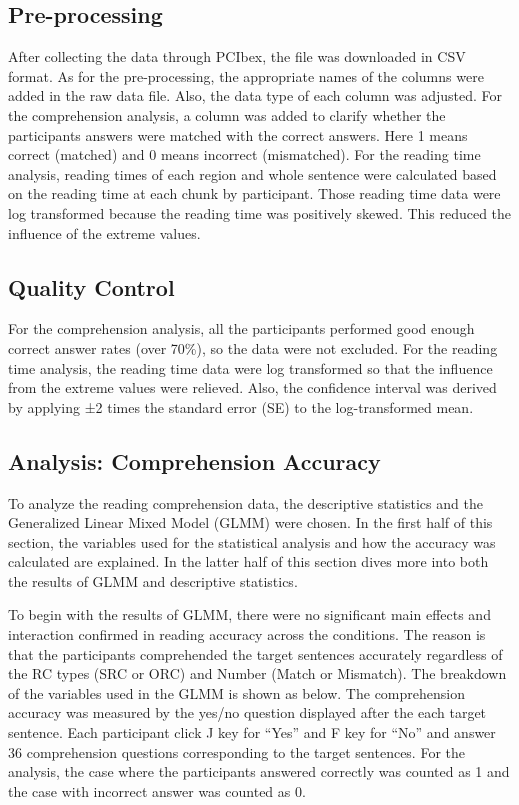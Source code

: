\documentclass[
]{article}
\begin{document}
\subsection{Pre-processing}\label{pre-processing}

After collecting the data through PCIbex, the file was downloaded in CSV
format. As for the pre-processing, the appropriate names of the columns
were added in the raw data file. Also, the data type of each column was
adjusted. For the comprehension analysis, a column was added to clarify
whether the participants answers were matched with the correct answers.
Here 1 means correct (matched) and 0 means incorrect (mismatched). For
the reading time analysis, reading times of each region and whole
sentence were calculated based on the reading time at each chunk by
participant. Those reading time data were log transformed because the
reading time was positively skewed. This reduced the influence of the
extreme values.

\subsection{Quality Control}\label{quality-control}

For the comprehension analysis, all the participants performed good
enough correct answer rates (over 70\%), so the data were not excluded.
For the reading time analysis, the reading time data were log
transformed so that the influence from the extreme values were relieved.
Also, the confidence interval was derived by applying ±2 times the
standard error (SE) to the log-transformed mean.

\subsection{Analysis: Comprehension
Accuracy}\label{analysis-comprehension-accuracy}

To analyze the reading comprehension data, the descriptive statistics
and the Generalized Linear Mixed Model (GLMM) were chosen. In the first
half of this section, the variables used for the statistical analysis
and how the accuracy was calculated are explained. In the latter half of
this section dives more into both the results of GLMM and descriptive
statistics.

To begin with the results of GLMM, there were no significant main
effects and interaction confirmed in reading accuracy across the
conditions. The reason is that the participants comprehended the target
sentences accurately regardless of the RC types (SRC or ORC) and Number
(Match or Mismatch). The breakdown of the variables used in the GLMM is
shown as below. The comprehension accuracy was measured by the yes/no
question displayed after the each target sentence. Each participant
click J key for ``Yes'' and F key for ``No'' and answer 36 comprehension
questions corresponding to the target sentences. For the analysis, the
case where the participants answered correctly was counted as 1 and the
case with incorrect answer was counted as 0.
\end{document}
